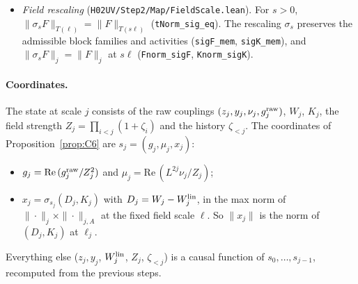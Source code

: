 \documentclass[11pt]{amsart}
\theoremstyle{definition}
\theoremstyle{remark}
\numberwithin{equation}{section}
\begin{document}
\begin{itemize}
\begin{itemize}
\begin{itemize}
    \item \texttt{stepK\_tsW} also has the output weight $\mu A$, $\mu\ge1$, which absorbs the
      factor $e^{2^d\delta}$ of $K^\flat$;
    \item the single-scale statements are the specialisations $\ell'=\ell_C=\ell$.
    \end{itemize}
  \end{itemize}
\item \emph{Field rescaling} (\texttt{H02UV/Step2/Map/FieldScale.lean}). For $s>0$,
  $\|\sigma_sF\|_{T(\ell)}=\|F\|_{T(s\ell)}$ (\texttt{tNorm\_sig\_eq}). The rescaling $\sigma_s$ preserves the
  admissible block families and activities (\texttt{sigF\_mem}, \texttt{sigK\_mem}), and
  $\|\sigma_sF\|_{j}=\|F\|_{j}$ at $s\ell$ (\texttt{Fnorm\_sigF}, \texttt{Knorm\_sigK}).
\end{itemize}

\paragraph{Coordinates.} The state at scale $j$ consists of the raw couplings
$(z_j,y_j,\nu_j,g_j^{\rm raw})$, $W_j$, $K_j$, the field strength $Z_j=\prod_{i<j}(1+\zeta_i)$ and
the history $\zeta_{<j}$. The coordinates of Proposition~\ref{prop:C6} are $s_j=(g_j,\mu_j,x_j)$:
\begin{itemize}
\item $g_j=\mathrm{Re}\,(g^{\rm raw}_j/Z_j^2)$ and $\mu_j=\mathrm{Re}\,(L^{2j}\nu_j/Z_j)$;
\item $x_j=\sigma_{s_j}(D_j,K_j)$ with $D_j=W_j-W^{\rm lin}_j$, in the max norm of
  $\|\cdot\|_j\times\|\cdot\|_{j,A}$ at the fixed field scale $\ell$. So $\|x_j\|$ is the norm of
  $(D_j,K_j)$ at $\ell_j$.
\end{itemize}
Everything else ($z_j,y_j$, $W^{\rm lin}_j$, $Z_j$, $\zeta_{<j}$) is a causal function of
$s_0,\dots,s_{j-1}$, recomputed from the previous steps.
\end{document}
